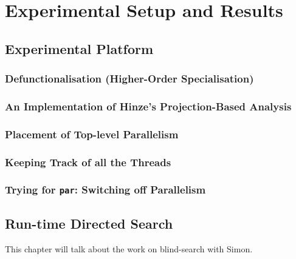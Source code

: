 \documentclass[dottedtoc, headinclude, footinclude=true, a4paper, numbers=noenddot]{scrreprt}
\begin{document}
\part{Experimental Setup and Results}
\label{part:implementation}

    \chapter{Experimental Platform} 
    \label{chap:platform}
    
    
        \section{Defunctionalisation (Higher-Order Specialisation)}
        \label{sec:defunctionalisation}
        
    
        \section{An Implementation of Hinze's Projection-Based Analysis}
        \label{sec:hinzeImplementation}
        
        \section{Placement of Top-level Parallelism}
        \label{sec:parPlacement}
        
    
        \section{Keeping Track of all the Threads}
        \label{sec:logging}
        
    
        \section{Trying for \texttt{par}: Switching off Parallelism}
        \label{sec:parSwitching}
        
    
    \chapter{Run-time Directed Search}
    \label{chap:blind}
    
        This chapter will talk about the work on blind-search with Simon.
    
\end{document}
